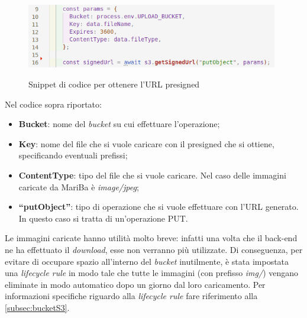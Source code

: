 	\begin{figure}[H]
		\centering
		\includegraphics[width=11cm]{immagini/getURL.png} \\
		\caption{\label{fig:getURL} Snippet di codice per ottenere l'URL presigned}
	\end{figure}
	
	Nel codice sopra riportato:
	\begin{itemize}
		\item \textbf{Bucket}: nome del \emph{bucket} su cui effettuare l'operazione;
		\item \textbf{Key}: nome del file che si vuole caricare con il presigned che si ottiene, specificando eventuali prefissi;
		\item \textbf{ContentType}: tipo del file che si vuole caricare. Nel caso delle immagini caricate da MariBa è \emph{image/jpeg};
		\item \textbf{``putObject''}: tipo di operazione che si vuole effettuare con l'URL generato. In questo caso si 
		tratta di un'operazione PUT.
	\end{itemize}
	Le immagini caricate hanno utilità molto breve: infatti una volta che il back-end ne ha effettuato il \emph{download}, 
	esse non verranno più utilizzate. Di conseguenza, per evitare di occupare spazio all'interno del \emph{bucket} inutilmente, è stata impostata una \emph{lifecycle rule} in modo tale che tutte le immagini (con prefisso \emph{img/}) vengano eliminate in modo automatico dopo un giorno dal loro caricamento.
	Per informazioni specifiche riguardo alla \emph{lifecycle rule} fare riferimento alla \autoref{subsec:bucketS3}.
	
